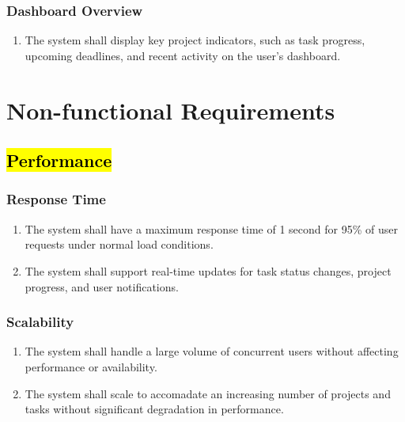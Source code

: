 \documentclass[]{article}
\begin{document}
            \subsubsection{Dashboard Overview}
            \begin{enumerate}[label=\scriptsize\textbf{\textcolor{gray}{FR-ALL-\arabic{allCounter}}}, leftmargin=*, itemsep=-4px]
                \item The system shall display key project indicators, such as task progress, upcoming deadlines, and recent activity on the user’s dashboard.
            \end{enumerate}



    \newpage


    \section{Non-functional Requirements}
        \subsection{\hl{Performance}}
            \subsubsection{Response Time}
            \begin{enumerate}[label=\scriptsize\textbf{\textcolor{gray}{NFR-PERF-\arabic{performanceCounter}}}, leftmargin=*, itemsep=-4px]
                \item The system shall have a maximum response time of 1 second for 95\% of user requests under normal load conditions.
                \item The system shall support real-time updates for task status changes, project progress, and user notifications.
            \end{enumerate}

            \subsubsection{Scalability}
            \begin{enumerate}[label=\scriptsize\textbf{\textcolor{gray}{NFR-PERF-\arabic{performanceCounter}}}, leftmargin=*, itemsep=-4px]
                \item The system shall handle a large volume of concurrent users without affecting performance or availability.
                \item The system shall scale to accomadate an increasing number of projects and tasks without significant degradation in performance.
            \end{enumerate}
\end{document}
